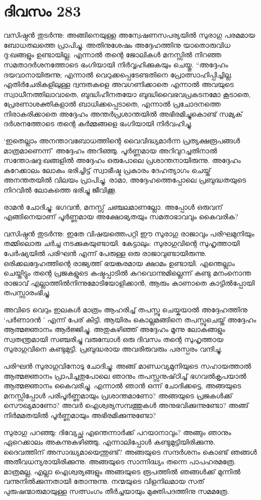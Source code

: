 \section{ദിവസം 283}


വസിഷ്ഠന്‍ തുടര്‍ന്നു: അങ്ങിനെയുള്ള അന്വേഷണസപര്യയില്‍ സുരാഗു പരമമായ ബോധതലത്തെ പ്രാപിച്ചു. അതിനുശേഷം അദ്ദേഹത്തിനു യാതൊരുവിധ ദു:ഖങ്ങളും ഉണ്ടായില്ല. എന്നാല്‍ തന്റെ ജോലികള്‍ മനസ്സില്‍ നിറഞ്ഞ സമതാദര്‍ശനത്തോടെ ഭംഗിയായി നിര്‍വ്വഹിക്കുകയും ചെയ്തു. “അദ്ദേഹം ദയവാനായിരുന്നു; എന്നാല്‍ വെറുക്കപ്പെടേണ്ടതിനെ പ്രോത്സാഹിപ്പിച്ചില്ല. എതിര്‍ചേരികളിലുള്ള ദ്വന്ദതകളെ അവഗണിക്കാതെ എന്നാല്‍ അവയുടെ സ്വാധീനത്തിലാവാതെ, ബുദ്ധിഹീനതയോ ബുദ്ധിവൈഭവപ്രകടനമോ കൂടാതെ, പ്രേരണാശക്തികളാല്‍ ബാധിക്കപ്പെടാതെ, എന്നാല്‍ പ്രചോദനത്തെ നിരാകരിക്കാതെ അദ്ദേഹം അന്തര്‍പ്രശാന്തയില്‍ അഭിരമിച്ചുകൊണ്ട് സമ്യക് ദര്‍ശനത്തോടെ തന്റെ കര്‍മ്മങ്ങളെ ഭംഗിയായി നിര്‍വഹിച്ചു.     

‘ഇതെല്ലാം അനന്താവബോധത്തിന്റെ വൈവിദ്ധ്യമാര്‍ന്ന പ്രത്യക്ഷരൂപങ്ങള്‍ മാത്രമാണെന്ന്’ അദ്ദേഹം അറിഞ്ഞു. പൂര്‍ണ്ണമായ അറിവുറച്ചതിനാല്‍ സന്തോഷദു:ഖങ്ങളില്‍ അദ്ദേഹം ഒരുപോലെ പ്രശാന്തനായിരുന്നു. അദ്ദേഹം കുറേക്കാലം ലോകം ഭരിച്ചിട്ട് സ്വാഭീഷ്ട പ്രകാരം ദേഹത്യാഗം ചെയ്ത് അനന്തതയില്‍ വിലയം പ്രാപിച്ചു. രാമാ, അദ്ദേഹത്തെപ്പോലെ  പ്രബുദ്ധതയുടെ നിറവില്‍ ലോകത്തെ ഭരിച്ചു ജീവിക്കൂ.

രാമന്‍ ചോദിച്ചു: ഭഗവന്‍, മനസ്സ്‌ ചഞ്ചലമാണല്ലോ. അപ്പോള്‍ ഒരുവന് എങ്ങിനെയാണ് പൂര്‍ണ്ണമായ അക്ഷോഭ്യതയും സമതാഭാവവും കൈവരിക?

വസിഷ്ഠന്‍ തുടര്‍ന്നു: ഇതേ വിഷയത്തെപറ്റി ഈ സുരാഗു രാജാവും പരിഘമുനിയും തമ്മിലൊരു ചര്‍ച്ച നടക്കുകയുണ്ടായി. കേട്ടാലും: സുരാഗുവിന്റെ സുഹൃത്തായി പേര്‍ഷ്യയില്‍ പരിഘന്‍ എന്ന് പേരുള്ള ഒരു രാജാവുണ്ടായിരുന്നു. ഒരിക്കലദ്ദേഹത്തിന്റെ രാജ്യത്ത് ഭയങ്കരമായ ക്ഷാമം ഉണ്ടായി. എന്തെല്ലാം ചെയ്തിട്ടും തന്റെ പ്രജകളുടെ കഷ്ടപ്പാടില്‍ കുറവൊന്നുമില്ലെന്ന് കണ്ടു മനംനൊന്ത രാജാവ് എല്ലാത്തില്‍നിന്നുമോടിയോളിക്കാന്‍, ആരും കാണാതെ  കാട്ടില്‍പ്പോയി തപസ്സാരംഭിച്ചു.

അവിടെ വെറും ഇലകള്‍ മാത്രം ആഹരിച്ച് തപസ്സു ചെയ്കയാല്‍ അദ്ദേഹത്തിനു ‘പര്‍ണാദന്‍ ’ എന്ന് പേര് കിട്ടി. ആയിരം കൊല്ലമങ്ങിനെ തപസ്സുചെയ്ത് അദ്ദേഹം ആത്മജ്ഞാനം ആര്‍ജ്ജിച്ചു. അതുകഴിഞ്ഞ് അദ്ദേഹം മൂന്നു ലോകങ്ങളും സ്വതന്ത്രമായി സഞ്ചരിച്ചു വരുമ്പോള്‍ ഒരു ദിവസം തന്റെ സുഹൃത്തായ സുരാഗുവിനെ കണ്ടുമുട്ടി. പ്രബുദ്ധരായ അവരിരുവരും പരസ്പരം വന്ദിച്ചു.

പരിഘന്‍ സുരാഗുവിനോടു ചോദിച്ചു: അങ്ങ് മാണ്ഡവ്യമുനിയുടെ സഹായത്താല്‍ ആത്മജ്ഞാനം പ്രാപിച്ചതുപോലെ ഞാനും തപസ്സനുഷ്‌ഠിച്ച് ഭഗവല്‍കൃപയാല്‍ ആത്മജ്ഞാനം കൈവരിച്ചു. എന്നാല്‍ ഞാന്‍ ഒന്ന് ചോദിക്കട്ടെ, അങ്ങയുടെ മനസ്സിപ്പോള്‍ പരിപൂര്‍ണ്ണമായും പ്രശാന്തമാണോ? അങ്ങയുടെ പ്രജകള്‍ക്ക് സൌഖ്യമാണോ? അവര്‍ ഐശ്വര്യസമ്പത്തുകള്‍ അനുഭവിക്കുന്നുണ്ടോ? അങ്ങ് നിര്‍മമതയില്‍ പൂര്‍ണ്ണമായും അഭിരമിക്കുന്നുണ്ടോ? 

സുരാഗു പറഞ്ഞു: ദിവ്യേച്ഛ എന്തെന്നാര്‍ക്ക് പറയാനാവും? അങ്ങും ഞാനും ഏറെക്കാലം അകന്നുകഴിഞ്ഞു. എന്നാലിപ്പോള്‍ കണ്ടുമുട്ടിയിരിക്കുന്നു. ദൈവത്തിന് അസാദ്ധ്യമായെന്തുണ്ട്? അങ്ങയുടെ സന്ദര്‍ശനം കൊണ്ട് ഞങ്ങള്‍ അതീവധന്യരായിരിക്കുന്നു. അങ്ങയുടെ സാന്നിദ്ധ്യം തന്നെ പാപഹരമത്രേ. മാത്രമല്ല, എല്ലാ ഐശ്വര്യങ്ങളും അങ്ങയുടെ രൂപത്തില്‍ ഞങ്ങള്‍ക്ക് മുന്നില്‍ വന്നുനില്‍ക്കുന്നതായി തോന്നുന്നു. നന്മയുടെ വിളനിലമായ സത് പുരുഷന്മാരുമായുള്ള സത്സംഗം തീര്‍ച്ചയായും മുക്തിപദത്തിനു സമമത്രേ.
